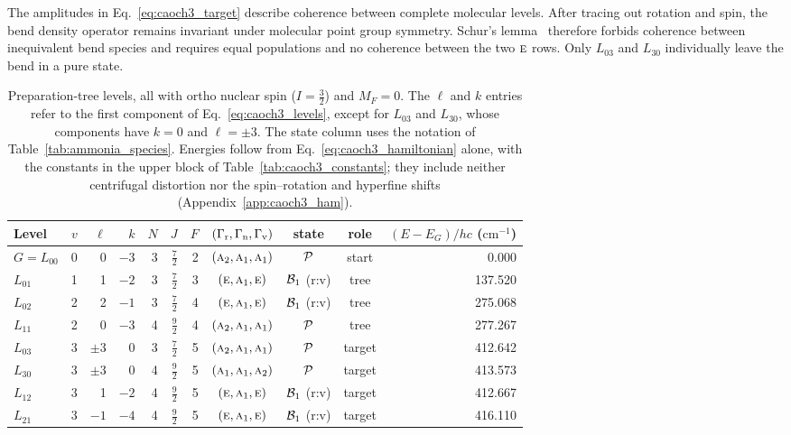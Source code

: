The amplitudes in Eq.~\eqref{eq:caoch3_target} describe coherence between complete molecular levels. After tracing out rotation and spin, the bend density operator remains invariant under molecular point group symmetry. Schur's lemma~\cite{hamermesh1989} therefore forbids coherence between inequivalent bend species and requires equal populations and no coherence between the two $\text{\normalfont\scshape e}$ rows. Only $L_{03}$ and $L_{30}$ individually leave the bend in a pure state.


\begin{table}[h]
\centering
\small
\caption{Preparation-tree levels, all with ortho nuclear spin ($I=\tfrac32$) and $M_F=0$. The $\ell$ and $k$ entries refer to the first component of Eq.~\eqref{eq:caoch3_levels}, except for $L_{03}$ and $L_{30}$, whose components have $k=0$ and $\ell=\pm3$. The state column uses the notation of Table~\ref{tab:ammonia_species}. Energies follow from Eq.~\eqref{eq:caoch3_hamiltonian} alone, with the constants in the upper block of Table~\ref{tab:caoch3_constants}; they include neither centrifugal distortion nor the spin--rotation and hyperfine shifts (Appendix~\ref{app:caoch3_ham}).}
\label{tab:caoch3_levels}
\begin{tabular}{lrrrrrrcccr}
\toprule
Level & $v$ & $\ell$ & $k$ & $N$ & $J$ & $F$ & $(\Gamma_{\mathrm{r}},\Gamma_{\mathrm{n}},\Gamma_{\mathrm{v}})$ & state & role & $(E-E_G)/hc$ ($\mathrm{cm^{-1}}$)\\
\midrule
$G=L_{00}$ & 0 & 0 & $-3$ & 3 & $\tfrac72$ & 2 & $(\text{\normalfont\scshape a}_{2},\text{\normalfont\scshape a}_{1},\text{\normalfont\scshape a}_{1})$ & $\mathcal{P}$ & start & 0.000\\
$L_{01}$ & 1 & 1 & $-2$ & 3 & $\tfrac72$ & 3 & $(\text{\normalfont\scshape e},\text{\normalfont\scshape a}_{1},\text{\normalfont\scshape e})$ & $\mathcal{B}_{1}$ (r:v) & tree & 137.520\\
$L_{02}$ & 2 & 2 & $-1$ & 3 & $\tfrac72$ & 4 & $(\text{\normalfont\scshape e},\text{\normalfont\scshape a}_{1},\text{\normalfont\scshape e})$ & $\mathcal{B}_{1}$ (r:v) & tree & 275.068\\
$L_{11}$ & 2 & 0 & $-3$ & 4 & $\tfrac92$ & 4 & $(\text{\normalfont\scshape a}_{2},\text{\normalfont\scshape a}_{1},\text{\normalfont\scshape a}_{1})$ & $\mathcal{P}$ & tree & 277.267\\
$L_{03}$ & 3 & $\pm3$ & 0 & 3 & $\tfrac72$ & 5 & $(\text{\normalfont\scshape a}_{2},\text{\normalfont\scshape a}_{1},\text{\normalfont\scshape a}_{1})$ & $\mathcal{P}$ & target & 412.642\\
$L_{30}$ & 3 & $\pm3$ & 0 & 4 & $\tfrac92$ & 5 & $(\text{\normalfont\scshape a}_{1},\text{\normalfont\scshape a}_{1},\text{\normalfont\scshape a}_{2})$ & $\mathcal{P}$ & target & 413.573\\
$L_{12}$ & 3 & 1 & $-2$ & 4 & $\tfrac92$ & 5 & $(\text{\normalfont\scshape e},\text{\normalfont\scshape a}_{1},\text{\normalfont\scshape e})$ & $\mathcal{B}_{1}$ (r:v) & target & 412.667\\
$L_{21}$ & 3 & $-1$ & $-4$ & 4 & $\tfrac92$ & 5 & $(\text{\normalfont\scshape e},\text{\normalfont\scshape a}_{1},\text{\normalfont\scshape e})$ & $\mathcal{B}_{1}$ (r:v) & target & 416.110\\
\bottomrule
\end{tabular}
\end{table}

